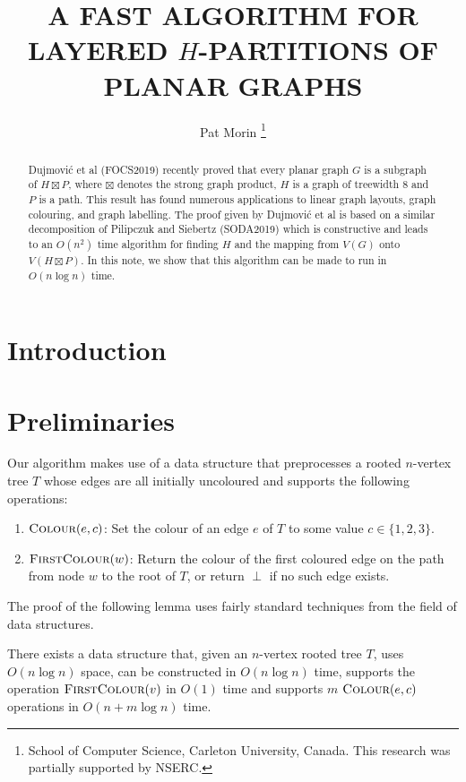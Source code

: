 \documentclass[kpfonts]{patmorin}
\title{\MakeUppercase{A Fast Algorithm for Layered $H$-Partitions of Planar Graphs}}
\author{
  Pat Morin%
    \thanks{School of Computer Science, Carleton University, Canada. This research was partially supported by NSERC.}
}
\date{}
\begin{document}
\begin{titlepage}
\maketitle

\begin{abstract}
  Dujmović et al (FOCS2019) recently proved that every planar graph $G$ is a subgraph of $H\boxtimes P$, where $\boxtimes$ denotes the strong graph product, $H$ is a graph of treewidth 8 and $P$ is a path.  This result has found numerous applications to linear graph layouts, graph colouring, and graph labelling.  The proof given by Dujmović et al is based on a similar decomposition of Pilipczuk and Siebertz (SODA2019) which is constructive and leads to an $O(n^2)$ time algorithm for finding $H$ and the mapping from $V(G)$ onto $V(H\boxtimes P)$.  In this note, we show that this algorithm can be made to run in $O(n\log n)$ time.
\end{abstract}
\end{titlepage}
\tableofcontents

\newpage

\setcounter{page}{0}
\section{Introduction}

\section{Preliminaries}

Our algorithm makes use of a data structure that preprocesses a rooted $n$-vertex tree $T$ whose edges are all initially uncoloured and supports the following operations:
\begin{enumerate}
  \item $\textsc{Colour}(e,c)$: Set the colour of an edge $e$ of $T$ to some value $c\in\{1,2,3\}$.
  \item $\textsc{FirstColour}(w)$: Return the colour of the first coloured edge on the path from node $w$ to the root of $T$, or return $\perp$ if no such edge exists.
\end{enumerate}

The proof of the following lemma uses fairly standard techniques from the field of data structures.

\begin{lem}
  There exists a data structure that, given an $n$-vertex rooted tree $T$, uses $O(n\log n)$ space, can be constructed in $O(n\log n)$ time, supports the operation $\textsc{FirstColour}(v)$ in $O(1)$ time and supports $m$ $\textsc{Colour}(e,c)$ operations in $O(n+m\log n)$ time.
\end{lem}
\end{document}
